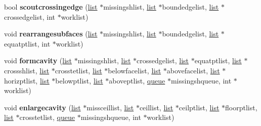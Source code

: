 \begin{DoxyCompactItemize}
\mbox{\label{classStemMesh3D_1_1tetgenmesh_a6414326241fd28d62ac9212f37f2f95f}} 
bool {\bfseries scoutcrossingedge} (\hyperlink{classStemMesh3D_1_1tetgenmesh_1_1list}{list} $\ast$missingshlist, \hyperlink{classStemMesh3D_1_1tetgenmesh_1_1list}{list} $\ast$boundedgelist, \hyperlink{classStemMesh3D_1_1tetgenmesh_1_1list}{list} $\ast$crossedgelist, int $\ast$worklist)
\item 
\mbox{\label{classStemMesh3D_1_1tetgenmesh_af72583f61432ab184c080998a07bf4d2}} 
void {\bfseries rearrangesubfaces} (\hyperlink{classStemMesh3D_1_1tetgenmesh_1_1list}{list} $\ast$missingshlist, \hyperlink{classStemMesh3D_1_1tetgenmesh_1_1list}{list} $\ast$boundedgelist, \hyperlink{classStemMesh3D_1_1tetgenmesh_1_1list}{list} $\ast$equatptlist, int $\ast$worklist)
\item 
\mbox{\label{classStemMesh3D_1_1tetgenmesh_a2dab0fc250cad5a282b70f9d6ad7c42e}} 
void {\bfseries formcavity} (\hyperlink{classStemMesh3D_1_1tetgenmesh_1_1list}{list} $\ast$missingshlist, \hyperlink{classStemMesh3D_1_1tetgenmesh_1_1list}{list} $\ast$crossedgelist, \hyperlink{classStemMesh3D_1_1tetgenmesh_1_1list}{list} $\ast$equatptlist, \hyperlink{classStemMesh3D_1_1tetgenmesh_1_1list}{list} $\ast$crossshlist, \hyperlink{classStemMesh3D_1_1tetgenmesh_1_1list}{list} $\ast$crosstetlist, \hyperlink{classStemMesh3D_1_1tetgenmesh_1_1list}{list} $\ast$belowfacelist, \hyperlink{classStemMesh3D_1_1tetgenmesh_1_1list}{list} $\ast$abovefacelist, \hyperlink{classStemMesh3D_1_1tetgenmesh_1_1list}{list} $\ast$horizptlist, \hyperlink{classStemMesh3D_1_1tetgenmesh_1_1list}{list} $\ast$belowptlist, \hyperlink{classStemMesh3D_1_1tetgenmesh_1_1list}{list} $\ast$aboveptlist, \hyperlink{classStemMesh3D_1_1tetgenmesh_1_1queue}{queue} $\ast$missingshqueue, int $\ast$worklist)
\item 
\mbox{\label{classStemMesh3D_1_1tetgenmesh_a2b8c0aa039da4a20249ce9ceef1f0b35}} 
void {\bfseries enlargecavity} (\hyperlink{classStemMesh3D_1_1tetgenmesh_1_1list}{list} $\ast$missceillist, \hyperlink{classStemMesh3D_1_1tetgenmesh_1_1list}{list} $\ast$ceillist, \hyperlink{classStemMesh3D_1_1tetgenmesh_1_1list}{list} $\ast$ceilptlist, \hyperlink{classStemMesh3D_1_1tetgenmesh_1_1list}{list} $\ast$floorptlist, \hyperlink{classStemMesh3D_1_1tetgenmesh_1_1list}{list} $\ast$crosstetlist, \hyperlink{classStemMesh3D_1_1tetgenmesh_1_1queue}{queue} $\ast$missingshqueue, int $\ast$worklist)

\end{DoxyCompactItemize}
